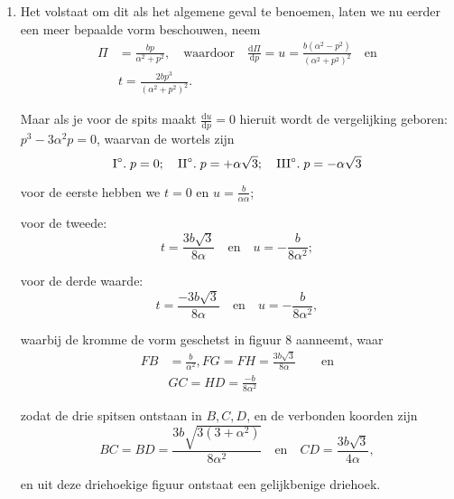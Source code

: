 \documentclass[10pt,a4paper]{article}
\newcommand{\switchenum}{\setcounter{enumi}{\arabic{enumi}-1}\switchcolumn}
\def\D{\mathrm{d}}
\begin{document}
\begin{paracol}{2}
\begin{enumerate}[topsep=1px]
		\switchenum
		\item Het volstaat om dit als het algemene geval te benoemen, laten we nu eerder een meer bepaalde vorm beschouwen, neem
		\begin{align*}
			\Pi &= \frac{bp}{\alpha^2 + p^2},\quad \text{waardoor} \quad \frac{\D \Pi}{\D p} =u = \frac{b(\alpha^2- p^2)}{(\alpha^2+p^2)^2}\quad \text{en}\\
			&t = \frac{2bp^3}{(\alpha^2+p^2)^2}.
		\end{align*}
		\par Maar als je voor de spits maakt $\frac{\D u}{\D p}=0$ hieruit wordt de vergelijking geboren: $p^3-3\alpha^2 p = 0$, waarvan de wortels zijn
		\[
			\text{I}\degree.\; p=0;\quad \text{II}\degree.\; p=+\alpha\sqrt{3};\quad  \text{III}\degree.\; p=-\alpha \sqrt{3}
		\]
		\par voor de eerste hebben we $t=0$ en $u=\frac{b}{\alpha \alpha}$;
		\par voor de tweede:
		\[
			t = \frac{3b\sqrt{3}}{8\alpha} \quad \text{en} \quad u = -\frac{b}{8\alpha^2};
		\]
		\par voor de derde waarde:
		\[
			t = \frac{-3b\sqrt{3}}{8\alpha} \quad \text{en} \quad u = -\frac{b}{8\alpha^2},
		\]
		\par waarbij de kromme de vorm geschetst in figuur 8 aanneemt, waar
		\begin{align*}
			FB &= \frac{b}{\alpha^2}, FG = FH = \frac{3b\sqrt{3}}{8\alpha} \qquad\text{en}\\
			&GC=HD=\frac{-b}{8\alpha^2}
		\end{align*}
		\par zodat de drie spitsen ontstaan in $B, C, D$, en de verbonden koorden zijn
		\[
			BC = BD = \frac{3b\sqrt{3(3+ \alpha^2)}}{8\alpha^2} \quad \text{en} \quad CD = \frac{3b\sqrt{3}}{4\alpha},
		\]
		\par en uit deze driehoekige figuur ontstaat een gelijkbenige driehoek.
	
		\switchcolumn*
		

\end{enumerate}
\end{paracol}
\end{document}
